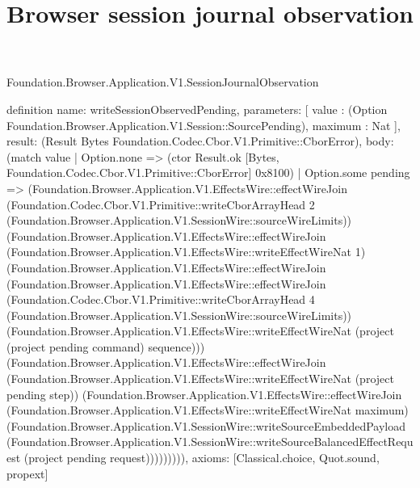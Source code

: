 \begin{lexlean}{Foundation.Browser.Application.V1.SessionJournalObservation}
\title{Browser session journal observation}
\begin{semanticmodule}
definition{
  name: writeSessionObservedPending,
  parameters: [
    value : (Option Foundation.Browser.Application.V1.Session::SourcePending),
    maximum : Nat
  ],
  result: (Result Bytes Foundation.Codec.Cbor.V1.Primitive::CborError),
  body: (match value
    | Option.none => (ctor Result.ok [Bytes, Foundation.Codec.Cbor.V1.Primitive::CborError] 0x8100)
    | Option.some pending => (Foundation.Browser.Application.V1.EffectsWire::effectWireJoin (Foundation.Codec.Cbor.V1.Primitive::writeCborArrayHead 2 (Foundation.Browser.Application.V1.SessionWire::sourceWireLimits)) (Foundation.Browser.Application.V1.EffectsWire::effectWireJoin (Foundation.Browser.Application.V1.EffectsWire::writeEffectWireNat 1) (Foundation.Browser.Application.V1.EffectsWire::effectWireJoin (Foundation.Browser.Application.V1.EffectsWire::effectWireJoin (Foundation.Codec.Cbor.V1.Primitive::writeCborArrayHead 4 (Foundation.Browser.Application.V1.SessionWire::sourceWireLimits)) (Foundation.Browser.Application.V1.EffectsWire::writeEffectWireNat (project (project pending command) sequence))) (Foundation.Browser.Application.V1.EffectsWire::effectWireJoin (Foundation.Browser.Application.V1.EffectsWire::writeEffectWireNat (project pending step)) (Foundation.Browser.Application.V1.EffectsWire::effectWireJoin (Foundation.Browser.Application.V1.EffectsWire::writeEffectWireNat maximum) (Foundation.Browser.Application.V1.SessionWire::writeSourceEmbeddedPayload (Foundation.Browser.Application.V1.SessionWire::writeSourceBalancedEffectRequest (project pending request))))))))),
  axioms: [Classical.choice, Quot.sound, propext]
}


\end{semanticmodule}
\end{lexlean}
